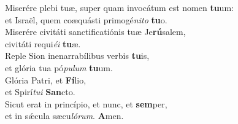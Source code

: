 \evenverse Miserére plebi tuæ, super quam invocátum est nomen \textbf{tu}um:~\*\\
\evenverse et Israël, quem coæquásti primogé\textit{ni}\textit{to} \textbf{tu}o.\\
\oddverse Miserére civitáti sanctificatiónis tuæ Je\textbf{rú}salem,~\*\\
\oddverse civitáti requi\textit{é}\textit{i} \textbf{tu}æ.\\
\evenverse Reple Sion inenarrabílibus verbis \textbf{tu}is,~\*\\
\evenverse et glória tua pó\textit{pu}\textit{lum} \textbf{tu}um.\\
\oddverse Glória Patri, et \textbf{Fí}lio,~\*\\
\oddverse et Spirí\textit{tu}\textit{i} \textbf{San}cto.\\
\evenverse Sicut erat in princípio, et nunc, et \textbf{sem}per,~\*\\
\evenverse et in sǽcula sæcu\textit{ló}\textit{rum}. \textbf{A}men.\\
